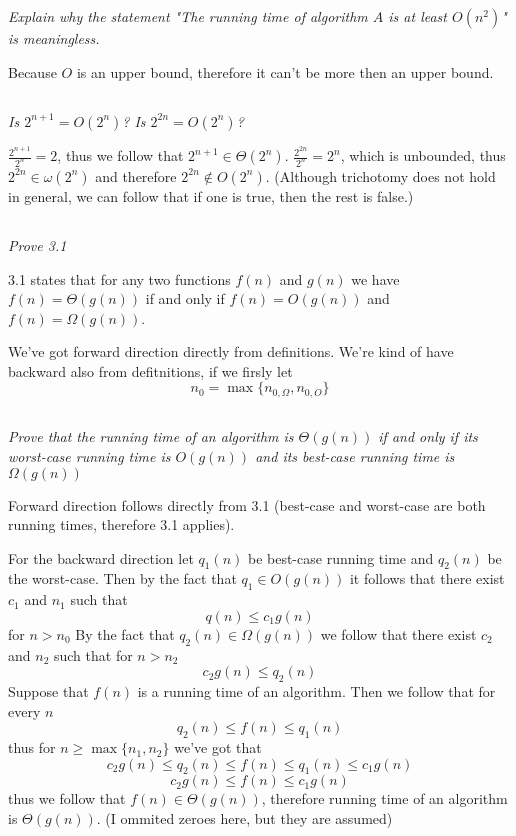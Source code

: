 \documentclass[11pt,oneside,titlepage]{book}
\begin{document}
\subsection{}

\textit{Explain why the statement "The running time of algorithm $A$ is at least $O(n^2)$" is
  meaningless.}

Because $O$ is an upper bound, therefore it can't be more then an upper bound.

\subsection{}

\textit{Is $2^{n + 1} = O(2^n)$? Is $2^{2n} = O(2^n)$?}

$\frac{2^{n + 1}}{2^n} = 2$, thus we follow that $2^{n + 1} \in \Theta(2^n)$.
$\frac{2^{2n}}{2^n} = 2^n$, which is unbounded, thus $2^{2n} \in \omega(2^n)$ and therefore
$2^{2n} \notin O(2^n)$. (Although trichotomy does not hold in general, we can follow that
if one is true, then the rest is false.)

\subsection{}

\textit{Prove 3.1}

3.1 states that for any two functions $f(n)$ and $g(n)$ we have $f(n) = \Theta(g(n))$ if and only
if $f(n) = O(g(n))$ and $f(n) = \Omega(g(n))$.

We've got forward direction directly from definitions. We're kind of have backward also from
defitnitions, if we firsly let
$$n_0 = \max\{n_{0, \Omega},n_{0, O}\}$$

\subsection{}

\textit{Prove that the running time of an algorithm is $\Theta(g(n))$ if and only if its
  worst-case running time is $O(g(n))$ and its best-case running time is $\Omega(g(n))$}

Forward direction follows directly from 3.1 (best-case and worst-case are both running times,
therefore 3.1 applies).

For the backward direction let $q_1(n)$ be best-case running time and $q_2(n)$ be the worst-case.
Then by the fact that $q_1 \in O(g(n))$ it follows that there exist $c_1$ and $n_1$ such that
$$q(n) \leq c_1 g(n)$$
for $n > n_0$
By the fact that $q_2(n) \in \Omega(g(n))$ we follow that there exist $c_2$ and $n_2$ such that
for $n > n_2$
$$c_2 g(n) \leq q_2(n)$$
Suppose that $f(n)$ is a running time of an algorithm. Then we follow that for every $n$
$$q_2(n) \leq f(n) \leq q_1(n)$$
thus for $n \geq \max\{n_1, n_2\}$ we've got that
$$c_2 g(n) \leq q_2(n) \leq f(n) \leq q_1(n) \leq c_1 g(n)$$
$$c_2 g(n) \leq f(n) \leq c_1 g(n)$$
thus we follow that $f(n) \in \Theta(g(n))$, therefore running time of an algorithm is
$\Theta(g(n))$. (I ommited zeroes here, but they are assumed)
\end{document}
